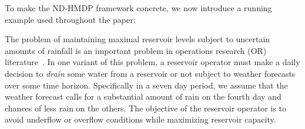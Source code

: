 To make the ND-HMDP framework concrete, we now introduce a running example used
throughout the paper:
\begin{example*}
The problem of maintaining maximal reservoir levels subject to
uncertain amounts of rainfall is an important problem in operations
research (OR) literature~\cite{Mahootchi2009,Yeh1985}.  In one
variant of this problem, a reservoir operator must
make a daily decision to \emph{drain} some water from a reservoir 
or not subject to weather forecasts over some time horizon.
Specifically in a seven day period, we assume that the weather forecast calls for a 
substantial amount of rain on the fourth day and chances of less rain on the
others.  The objective of the reservoir operator is to avoid underflow or
overflow conditions while maximizing reservoir capacity.


\end{example*}
